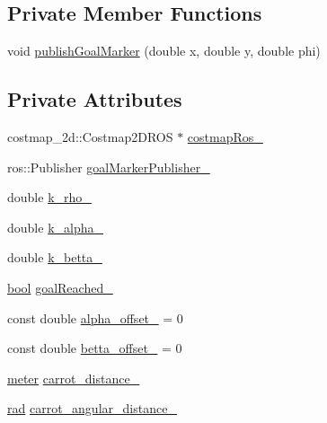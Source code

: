 \subsection*{Private Member Functions}
\begin{DoxyCompactItemize}
\item 
void \hyperlink{classforward__local__planner_1_1ForwardLocalPlanner_a31958a73b1082a6d42ee6ff157c10c58}{publish\+Goal\+Marker} (double x, double y, double phi)
\end{DoxyCompactItemize}
\subsection*{Private Attributes}
\begin{DoxyCompactItemize}
\item 
costmap\+\_\+2d\+::\+Costmap2\+D\+R\+OS $\ast$ \hyperlink{classforward__local__planner_1_1ForwardLocalPlanner_a2c232a05866edf1b71003188a03fc0c5}{costmap\+Ros\+\_\+}
\item 
ros\+::\+Publisher \hyperlink{classforward__local__planner_1_1ForwardLocalPlanner_aa0248e082872c2e4f594269e5a785188}{goal\+Marker\+Publisher\+\_\+}
\item 
double \hyperlink{classforward__local__planner_1_1ForwardLocalPlanner_a896f36d17c0c1a798e7129bda4c7b0b0}{k\+\_\+rho\+\_\+}
\item 
double \hyperlink{classforward__local__planner_1_1ForwardLocalPlanner_af707942dc2dc39e5836039929e3e6081}{k\+\_\+alpha\+\_\+}
\item 
double \hyperlink{classforward__local__planner_1_1ForwardLocalPlanner_ace6b518223f0cabe2fd672d438d83f34}{k\+\_\+betta\+\_\+}
\item 
\hyperlink{classbool}{bool} \hyperlink{classforward__local__planner_1_1ForwardLocalPlanner_a2041c1e8216fd7b6e9e00489fc463d4c}{goal\+Reached\+\_\+}
\item 
const double \hyperlink{classforward__local__planner_1_1ForwardLocalPlanner_adafa209756b07476ae13564da2d9b292}{alpha\+\_\+offset\+\_\+} = 0
\item 
const double \hyperlink{classforward__local__planner_1_1ForwardLocalPlanner_ac6ccaa5481ffd084621a4f47933c1ad7}{betta\+\_\+offset\+\_\+} = 0
\item 
\hyperlink{backward__local__planner_8h_ab6024a26b088c11b8a5218a469ae5a57}{meter} \hyperlink{classforward__local__planner_1_1ForwardLocalPlanner_a1a40532dac9a9471ded4b0caac433c93}{carrot\+\_\+distance\+\_\+}
\item 
\hyperlink{backward__local__planner_8h_a640effbe91ae9b25d698a883a9e80d96}{rad} \hyperlink{classforward__local__planner_1_1ForwardLocalPlanner_a6aa0cb605376c0ef854f104c60507bdd}{carrot\+\_\+angular\+\_\+distance\+\_\+}

\end{DoxyCompactItemize}
